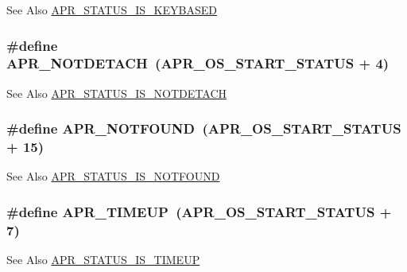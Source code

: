 \begin{DoxySeeAlso}{See Also}
\hyperlink{group___a_p_r___s_t_a_t_u_s___i_s_gaf43f4a40f5ab2fe196acb4e12f20b79e}{A\-P\-R\-\_\-\-S\-T\-A\-T\-U\-S\-\_\-\-I\-S\-\_\-\-K\-E\-Y\-B\-A\-S\-E\-D} 
\end{DoxySeeAlso}
\hypertarget{group___a_p_r___error_ga83b8407fb5de5840f51dfd2c1439987b}{
\subsubsection[{A\-P\-R\-\_\-\-N\-O\-T\-D\-E\-T\-A\-C\-H}]{\setlength{\rightskip}{0pt plus 5cm}\#define A\-P\-R\-\_\-\-N\-O\-T\-D\-E\-T\-A\-C\-H~({\bf A\-P\-R\-\_\-\-O\-S\-\_\-\-S\-T\-A\-R\-T\-\_\-\-S\-T\-A\-T\-U\-S} + 4)}}\label{group___a_p_r___error_ga83b8407fb5de5840f51dfd2c1439987b}
\begin{DoxySeeAlso}{See Also}
\hyperlink{group___a_p_r___s_t_a_t_u_s___i_s_ga3084551fdf84919e3c3db4384234521d}{A\-P\-R\-\_\-\-S\-T\-A\-T\-U\-S\-\_\-\-I\-S\-\_\-\-N\-O\-T\-D\-E\-T\-A\-C\-H} 
\end{DoxySeeAlso}
\hypertarget{group___a_p_r___error_ga9bd83273ff02f31f71fb4dc6f29df4a9}{
\subsubsection[{A\-P\-R\-\_\-\-N\-O\-T\-F\-O\-U\-N\-D}]{\setlength{\rightskip}{0pt plus 5cm}\#define A\-P\-R\-\_\-\-N\-O\-T\-F\-O\-U\-N\-D~({\bf A\-P\-R\-\_\-\-O\-S\-\_\-\-S\-T\-A\-R\-T\-\_\-\-S\-T\-A\-T\-U\-S} + 15)}}\label{group___a_p_r___error_ga9bd83273ff02f31f71fb4dc6f29df4a9}
\begin{DoxySeeAlso}{See Also}
\hyperlink{group___a_p_r___s_t_a_t_u_s___i_s_ga51bc0a0e249f5d09dba3ed9dc02c49e5}{A\-P\-R\-\_\-\-S\-T\-A\-T\-U\-S\-\_\-\-I\-S\-\_\-\-N\-O\-T\-F\-O\-U\-N\-D} 
\end{DoxySeeAlso}
\hypertarget{group___a_p_r___error_ga9ac087c25ffb0d3bb4d75bee36709853}{
\subsubsection[{A\-P\-R\-\_\-\-T\-I\-M\-E\-U\-P}]{\setlength{\rightskip}{0pt plus 5cm}\#define A\-P\-R\-\_\-\-T\-I\-M\-E\-U\-P~({\bf A\-P\-R\-\_\-\-O\-S\-\_\-\-S\-T\-A\-R\-T\-\_\-\-S\-T\-A\-T\-U\-S} + 7)}}\label{group___a_p_r___error_ga9ac087c25ffb0d3bb4d75bee36709853}
\begin{DoxySeeAlso}{See Also}
\hyperlink{group___a_p_r___s_t_a_t_u_s___i_s_ga864b207719c86ac4deeba696943262d0}{A\-P\-R\-\_\-\-S\-T\-A\-T\-U\-S\-\_\-\-I\-S\-\_\-\-T\-I\-M\-E\-U\-P} 
\end{DoxySeeAlso}
